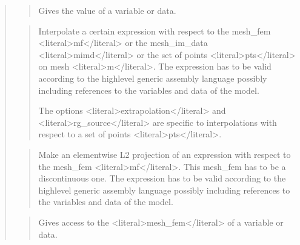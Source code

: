 \documentclass[a4paper,11pt,english]{sphinxmanual}
\begin{document}
\begin{quote}
\begin{quote}
\sphinxAtStartPar
Gives the value of a variable or data.
\end{quote}

\sphinxAtStartPar
{}
\begin{quote}

\sphinxAtStartPar
Interpolate a certain expression with respect to the mesh\_fem \textless{}literal\textgreater{}mf\textless{}/literal\textgreater{}
or the mesh\_im\_data \textless{}literal\textgreater{}mimd\textless{}/literal\textgreater{} or the set of points \textless{}literal\textgreater{}pts\textless{}/literal\textgreater{} on mesh \textless{}literal\textgreater{}m\textless{}/literal\textgreater{}.
The expression has to be valid according to the high\sphinxhyphen{}level generic
assembly language possibly including references to the variables
and data of the model.

\sphinxAtStartPar
The options \textless{}literal\textgreater{}extrapolation\textless{}/literal\textgreater{} and \textless{}literal\textgreater{}rg\_source\textless{}/literal\textgreater{} are specific to
interpolations with respect to a set of points \textless{}literal\textgreater{}pts\textless{}/literal\textgreater{}.
\end{quote}

\sphinxAtStartPar
{}
\begin{quote}

\sphinxAtStartPar
Make an elementwise L2 projection of an expression with respect
to the mesh\_fem \textless{}literal\textgreater{}mf\textless{}/literal\textgreater{}. This mesh\_fem has to be
a discontinuous one.
The expression has to be valid according to the high\sphinxhyphen{}level generic
assembly language possibly including references to the variables
and data of the model.
\end{quote}

\sphinxAtStartPar
{}
\begin{quote}

\sphinxAtStartPar
Gives access to the \textless{}literal\textgreater{}mesh\_fem\textless{}/literal\textgreater{} of a variable or data.
\end{quote}


\end{quote}
\end{document}
